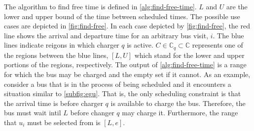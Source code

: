 \documentclass[11pt,a4paper,final]{article}
\newcommand{\C}{\mathbb{C}}                 %
\begin{document}
The algorithm to find free time is defined in \ref{alg:find-free-time}. \(L\) and \(U\) are the lower and upper bound of the time
between scheduled times. The possible use cases are depicted in \ref{fig:find-free}. In each case depicted by \ref{fig:find-free},
the red line shows the arrival and departure time for an arbitrary bus visit, \(i\). The blue lines indicate reigons in
which charger \(q\) is active. \(C \in \C_q \subset \C\) represents one of the regions between the blue lines, \([L, U]\) which stand
for the lower and upper portions of the regions, respectively. The output of \ref{alg:find-free-time} is a range for which the
bus may be charged and the empty set if it cannot. As an example, consider a bus that is in the process of being
scheduled and it encounters a situation similar to \autoref{subfig:egu}. That is, the only scheduling constraint is that
the arrival time is before charger \(q\) is available to charge the bus. Therefore, the bus must wait intil \(L\) before
changer \(q\) may charge it. Furthermore, the range that \(u_i\) must be selected from is \([L,e]\).
\end{document}

